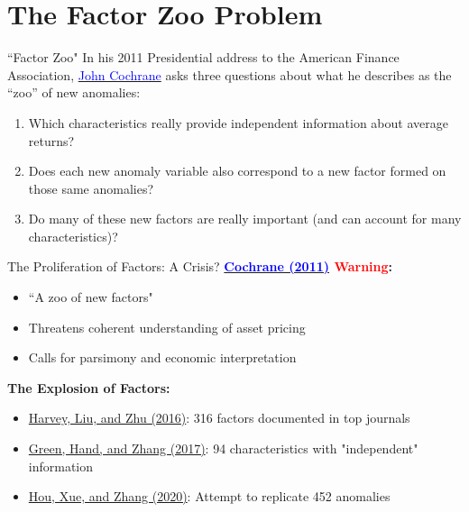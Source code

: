\documentclass{beamer}
\begin{document}
\section{The Factor Zoo Problem}

\begin{frame}{``Factor Zoo"}
	In his 2011 Presidential address to the American Finance Association, \href{https://onlinelibrary.wiley.com/doi/10.1111/j.1540-6261.2011.01671.x}{\textcolor{blue}{John Cochrane}}  asks three questions about what he describes as the “zoo” of new anomalies:
	\begin{enumerate}
		\item Which characteristics really provide independent information about average returns?
		\item Does each new anomaly variable also correspond to a new factor formed on those same anomalies?
		\item Do many of these new factors are really important (and can account for many
		characteristics)?
	\end{enumerate}
\end{frame}

\begin{frame}{The Proliferation of Factors: A Crisis?}
    \textbf{\href{https://onlinelibrary.wiley.com/doi/10.1111/j.1540-6261.2011.01671.x}{\textcolor{blue}{Cochrane (2011)}} \textcolor{red}{Warning}:}
    \begin{itemize}
        \item ``A zoo of new factors"
        \item Threatens coherent understanding of asset pricing
        \item Calls for parsimony and economic interpretation
    \end{itemize}

    \textbf{The Explosion of Factors:}
    \begin{itemize}
        \item \textcolor{blue}{\href{https://doi.org/10.1093/rfs/hhv059}{Harvey, Liu, and Zhu (2016)}}: 316 factors documented in top journals
        \item \textcolor{blue}{\href{https://academic.oup.com/rfs/article/30/12/4389/3091648}{Green, Hand, and Zhang (2017)}}: 94 characteristics with "independent" information
        \item \textcolor{blue}{\href{https://doi.org/10.1093/rfs/hhy131}{Hou, Xue, and Zhang (2020)}}: Attempt to replicate 452 anomalies
    \end{itemize}

\end{frame}
\end{document}
